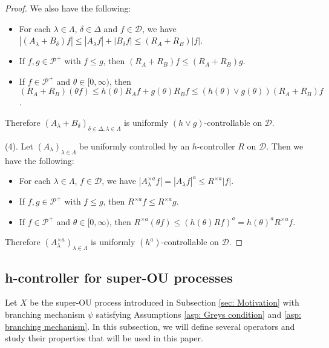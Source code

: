 \documentclass[12pt,a4paper]{amsart}
\theoremstyle{plain}
\theoremstyle{definition}
\numberwithin{equation}{section}
\begin{document}
\begin{proof}
    We also have the following:
\begin{itemize}
\item
    For each $\lambda \in \Lambda$, $\delta \in \Delta$ and $f\in \mathcal D$, we have $|(A_\lambda + B_\delta) f| \leq |A_\lambda f| + |B_\delta f| \leq (R_A + R_B) |f|$.
\item
        If $f,g \in \mathcal P^+$ with $f\leq g$, then $(R_A + R_B)f \leq (R_A + R_B) g$.
\item
        If $f \in \mathcal P^+$ and $\theta \in [0,\infty)$, then $(R_A + R_B) (\theta f) \leq h(\theta) R_Af + g(\theta) R_Bf \leq (h(\theta) \vee g(\theta)) (R_A+R_B)f $.
\end{itemize}
    Therefore $(A_\lambda + B_\delta)_{\delta\in \Delta, \lambda \in \Lambda}$ is uniformly $(h \vee g)$-controllable on $\mathcal D$.

    (4). Let $(A_\lambda)_{\lambda\in\Lambda}$ be uniformly controlled by an $h$-controller $R$ on $\mathcal D$.
Then we have the following:
\begin{itemize}
\item
    For each $\lambda \in \Lambda$, $f\in \mathcal D$, we have $|A_\lambda^{\times a} f| = |A_\lambda f|^a  \leq R^{\times a} |f|$.
\item
        If $f,g \in \mathcal P^+$ with $f\leq g$, then $R^{\times a}f \leq R^{\times a} g$.
\item
        If $f \in \mathcal P^+$ and $\theta \in [0,\infty)$, then $R^{\times a}(\theta f) \leq (h(\theta) R f)^a = h(\theta)^a R^{\times a}f$.
\end{itemize}
    Therefore $(A_\lambda^{\times a})_{\lambda \in \Lambda}$ is uniformly $(h^a)$-controllable on $\mathcal D$.
\end{proof}

\subsection{h-controller  for super-OU processes}
\label{sec: h-controller}
   Let $X$ be the super-OU process introduced in Subsection \ref{sec: Motivation}
    with branching mechanism $\psi$ satisfying
    Assumptions \ref{asp: Greys condition} and \ref{asp: branching mechanism}.
	In this subsection, we will define several operators and study their properties that will be used in this paper.
\end{document}
